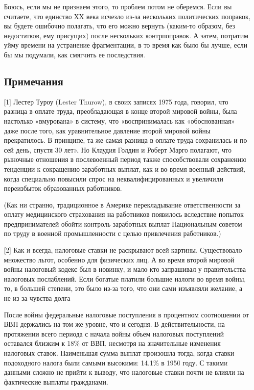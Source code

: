 \documentclass[ebook,12pt,oneside,openany]{memoir}
\begin{document}
Боюсь, если мы не признаем этого, то проблем потом не оберемся. Если
вы считаете, что единство ХХ века исчезло из-за нескольких
политических поправок, вы будете ошибочно полагать, что его можно
вернуть (каким-то образом, без недостатков, ему присущих) после
нескольких контрпоправок. А затем, потратим уйму времени на устранение
фрагментации, в то время как было бы лучше, если бы мы подумали, как
смягчить ее последствия. \newline

\subsection{Примечания}

[1] Лестер Туроу (Lester Thurow), в своих записях 1975 года, говорил,
что разница в оплате труда, преобладающая в конце второй мировой
войны, была настолько «вмурована» в систему, что «воспринималась как
«обоснованная» даже после того, как уравнительное давление второй
мировой войны прекратилось. В принципе, та же самая разница в оплате
труда сохранилась и по сей день, спустя 30 лет». Но Клаудия Голдин и
Роберт Марго полагают, что рыночные отношения в послевоенный период
также способствовали сохранению тенденции к сокращению заработных
выплат, как и во время военный действий, когда специально повысили
спрос на неквалифицированных и увеличили переизбыток образованных
работников. \newline

(Как ни странно, традиционное в Америке перекладывание ответственности
за оплату медицинского страхования на работников появилось вследствие
попыток предпринимателей обойти контроль заработных выплат
Национальным советом по труду в военной промышленности с целью
привлечения работников.) \newline

[2] Как и всегда, налоговые ставки не раскрывают всей картины.
Существовало множество льгот, особенно для физических лиц. А во время
второй мировой войны налоговый кодекс был в новинку, и мало кто
запрашивал у правительства налоговых послаблений. Если богатые платили
большие налоги во время войны, то, в большей степени, это было из-за
того, что они сами изъявляли желание, а не из-за чувства долга \newline

После войны федеральные налоговые поступления в процентном соотношении
от ВВП держались на том же уровне, что и сегодня. В действительности,
на протяжении всего периода с начала войны объем налоговых поступлений
оставался близким к 18\% от ВВП, несмотря на значительные изменения
налоговых ставок. Наименьшая сумма выплат произошла тогда, когда
ставки подоходного налога были самыми высокими: 14.1\% в 1950 году. С
такими данными сложно не прийти к выводу, что налоговые ставки почти
не влияли на фактические выплаты гражданами. \newline
\end{document}
